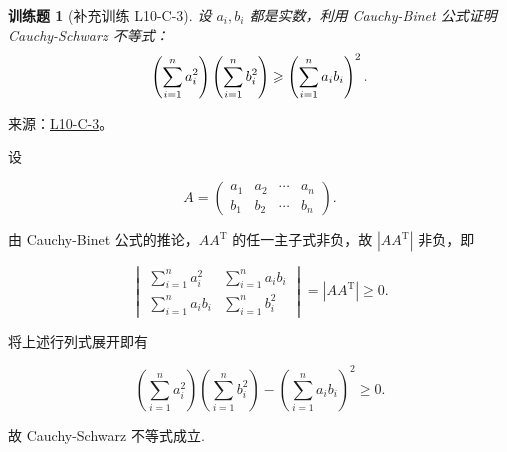 \documentclass[UTF8,12pt,a4paper,fontset=fandol]{ctexart}
\newtheorem{exercise}{训练题}[section]
\begin{document}
\begin{exercise}[补充训练 L10-C-3]\label{prob:L10-C-3}
设 $a_i, b_i$ 都是实数，利用 Cauchy-Binet 公式证明 Cauchy-Schwarz 不等式：
        \[
            \left( \sum_{i=1}^{n}\limits a_i^2 \right) \left( \sum_{i=1}^{n}\limits b_i^2 \right) \geqslant \left( \sum_{i=1}^{n}\limits a_i b_i \right)^2.
        \]
\end{exercise}
\noindent 来源：\href{https://github.com/yhwu-is/Linear-Algebra-Left-Undone/blob/new/%E8%AE%B2%E4%B9%89/%E4%B8%93%E9%A2%98/10%20%E8%A1%8C%E5%88%97%E5%BC%8F.tex}{L10-C-3}。
\begin{solve}
设

            \[
                A = \begin{pmatrix}
                    a_1 & a_2 & \cdots & a_n \\
                    b_1 & b_2 & \cdots & b_n
                \end{pmatrix}.
            \]

            由 Cauchy-Binet 公式的推论，$A A^{\mathrm{T}}$ 的任一主子式非负，故 $|AA^\mathrm{T}|$ 非负，即

            \[
                \begin{vmatrix}
                    \sum\limits_{i=1}^{n} a_i^2 & \sum\limits_{i=1}^{n} a_ib_i \\
                    \sum\limits_{i=1}^{n} a_ib_i & \sum\limits_{i=1}^{n} b_i^2
                \end{vmatrix} = |AA^\mathrm{T}| \geqslant 0.
            \]

            将上述行列式展开即有

            \[
                \left( \sum\limits_{i=1}^{n} a_i^2 \right) \left( \sum\limits_{i=1}^{n} b_i^2 \right) - \left( \sum\limits_{i=1}^{n} a_i b_i \right)^2 \geqslant 0.
            \]

            故 Cauchy-Schwarz 不等式成立.
\end{solve}
\end{document}
